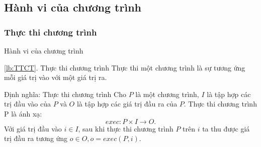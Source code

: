 %
%
%

\subsection{Hành vi của chương trình}
\subsubsection*{Thực thi chương trình}
\label{lb:TTCT}
\begin{frame}{Hành vi của chương trình}
\begin{block}{\ref{lb:TTCT}. Thực thi chương trình}
Thực thi một chương trình là sự tương ứng mỗi giá trị vào với một giá trị ra.
\end{block}

\begin{exampleblock}{Định nghĩa: Thực thi chương trình}
Cho $P$ là một chương trình, $I$ là tập hợp các trị đầu vào của $P$
và $O$ là tập hợp các giá trị đầu ra của $P$. Thực thi chương trình
P là ánh xạ:
\[exec: P \times I \rightarrow O.\]
Với giá trị đầu vào $i \in I$, sau khi thực thi chương trình $P$ trên
$i$ ta thu được giá trị đầu ra tương ứng $o \in O, o = exec(P, i)$.
\end{exampleblock}
\end{frame}

